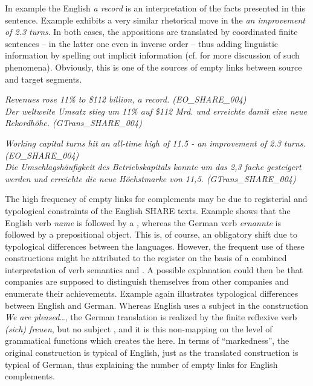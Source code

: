 \documentclass[output=paper]{LSP/langsci}
\begin{document}
\newpage 
In example  the English  \textit{a record} is an interpretation of the facts presented in this sentence. Example  exhibits a very similar rhetorical move in the  \textit{an improvement of 2.3 turns}. In both cases, the appositions are translated by coordinated finite sentences -- in the latter one even in inverse order -- thus adding linguistic information by spelling out implicit information (cf. \citealt{Hansen-SchirraEtAl2007} for more discussion of such phenomena). Obviously, this is one of the sources of empty links between source and target segments.

\ea\label{ex:culo:2}
   \ea 
    \textit{Revenues rose 11\% to \$112 billion, a record. \textup{(EO\_SHARE\_004)}}\\
    \ex \textit{Der weltweite Umsatz stieg um 11\% auf \$112 Mrd. und erreichte damit eine neue Rekordhöhe. \textup{(GTrans\_SHARE\_004)}} 
   \z
\z


\ea \label{ex:culo:3} 
   \ea \textit{Working capital turns hit an all-time high of 11.5 - an improvement of 2.3 turns. \textup{(EO\_SHARE\_004)}} \\
    \ex \textit{Die Umschlagshäufigkeit des Betriebskapitals konnte um das 2,3 fache gesteigert   werden und erreichte die neue Höchstmarke von 11,5. \textup{(GTrans\_SHARE\_004)}}
     \z
\z


The high frequency of empty links for complements may be due to registerial and typological constraints of the English SHARE texts. Example  shows that the English verb \textit{name} is followed by a , whereas the German verb \textit{ernannte} is followed by a prepositional object. This is, of course, an obligatory shift due to typological differences between the languages. However, the frequent use of these constructions might be attributed to the register on the basis of a combined interpretation of verb semantics and . A possible explanation could then be that companies are supposed to distinguish themselves from other companies and enumerate their achievements. Example  again illustrates typological differences between English and German. Whereas English uses a subject  in the construction \textit{We are pleased}\ldots, the German translation is realized by the finite reflexive verb \textit{(sich) freuen}, but no subject , and it is this non-mapping on the level of grammatical functions which creates the  here. In terms of ``markedness'', the original construction is typical of English, just as the translated construction is typical of German, thus explaining the number of empty links for English complements.
\end{document}
